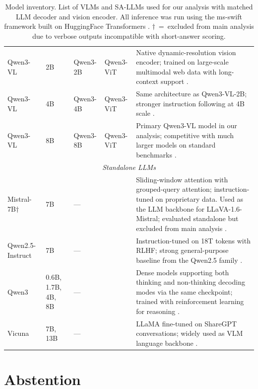 \documentclass[letterpaper]{article} %
\begin{document}
\begin{table}[!t]
\begin{tabularx}{\textwidth}{@{}lp{}llX@{}}
Qwen3-VL           & 2B   & Qwen3-2B           & Qwen3-ViT           & Native dynamic-resolution vision encoder; trained on large-scale multimodal web data with long-context support \citep{bai2025qwen3vl}. \\
Qwen3-VL           & 4B   & Qwen3-4B           & Qwen3-ViT           & Same architecture as Qwen3-VL-2B; stronger instruction following at 4B scale \citep{bai2025qwen3vl}. \\
Qwen3-VL           & 8B   & Qwen3-8B           & Qwen3-ViT           & Primary Qwen3-VL model in our analysis; competitive with much larger models on standard benchmarks \citep{bai2025qwen3vl}. \\
\midrule
\multicolumn{5}{c}{\textit{Standalone LLMs}} \\%
\midrule
Mistral-7B$\dagger$ & 7B  & \multicolumn{2}{l}{---} & Sliding-window attention with grouped-query attention; instruction-tuned on proprietary data. Used as the LLM backbone for LLaVA-1.6-Mistral; evaluated standalone but excluded from main analysis \citep{jiang2023mistral}. \\
Qwen2.5-Instruct    & 7B   & \multicolumn{2}{l}{---} & Instruction-tuned on 18T tokens with RLHF; strong general-purpose baseline from the Qwen2.5 family \citep{qwen2025qwen25}. \\
Qwen3               & 0.6B, 1.7B, 4B, 8B & \multicolumn{2}{l}{---} & Dense models supporting both thinking and non-thinking decoding modes via the same checkpoint; trained with reinforcement learning for reasoning \citep{yang2025qwen3}. \\
Vicuna              & 7B, 13B & \multicolumn{2}{l}{---} & LLaMA fine-tuned on ShareGPT conversations; widely used as VLM language backbone \citep{zheng2023vicuna}. \\
\bottomrule
\end{tabularx}
\caption{Model inventory. List of VLMs and SA-LLMs used for our analysis with matched LLM decoder and vision encoder. All inference was run using the ms-swift framework \citep{zhao2024swift} built on HuggingFace Transformers \citep{wolf2020transformers}. $\dagger$~=~excluded from main analysis due to verbose outputs incompatible with short-answer scoring.}
\end{table}

\clearpage
\section{Abstention}
\label{app:abstention}
\end{document}
